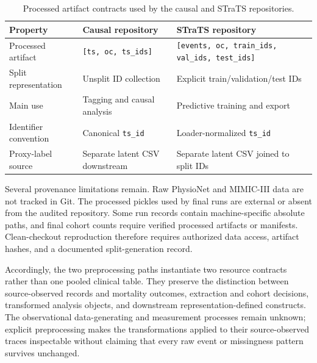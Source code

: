 \begin{table}[htbp]
\centering
\caption{Processed artifact contracts used by the causal and STraTS repositories.}
\label{tab:data-contracts}
\small
\begin{tabular}{L{0.20\textwidth}L{0.31\textwidth}L{0.39\textwidth}}
\toprule
Property & Causal repository & STraTS repository \\
\midrule
Processed artifact & \texttt{[ts, oc, ts\_ids]} & \texttt{[events, oc, train\_ids, val\_ids, test\_ids]} \\
Split representation & Unsplit ID collection & Explicit train/validation/test IDs \\
Main use & Tagging and causal analysis & Predictive training and export \\
Identifier convention & Canonical \texttt{ts\_id} & Loader-normalized \texttt{ts\_id} \\
Proxy-label source & Separate latent CSV downstream & Separate latent CSV joined to split IDs \\
\bottomrule
\end{tabular}
\end{table}

Several provenance limitations remain.  Raw PhysioNet and MIMIC-III data are not tracked in Git.  The processed pickles used by final runs are external or absent from the audited repository.  Some run records contain machine-specific absolute paths, and final cohort counts require verified processed artifacts or manifests.  Clean-checkout reproduction therefore requires authorized data access, artifact hashes, and a documented split-generation record.

Accordingly, the two preprocessing paths instantiate two resource contracts rather than one pooled clinical table.  They preserve the distinction between source-observed records and mortality outcomes, extraction and cohort decisions, transformed analysis objects, and downstream representation-defined constructs.  The observational data-generating and measurement processes remain unknown; explicit preprocessing makes the transformations applied to their source-observed traces inspectable without claiming that every raw event or missingness pattern survives unchanged.
